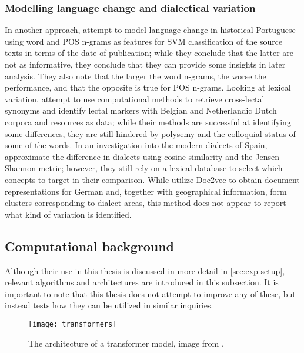 \subsubsection{Modelling language change and dialectical variation}
\label{subsubsec:modelling}

In another approach, \citet{zampieri-etal-2016-modeling} attempt to model language change in historical Portuguese using word and POS n-grams as features for SVM classification of the source texts in terms of the date of publication; while they conclude that the latter are not as informative, they conclude that they can provide some insights in later analysis. They also note that the larger the word n-grams, the worse the performance, and that the opposite is true for POS n-grams. Looking at lexical variation, \citet{peirsman_geeraerts_speelman_2010} attempt to use computational methods to retrieve cross-lectal synonyms and identify lectal markers with Belgian and Netherlandic Dutch corpora and resources as data; while their methods are successful at identifying some differences, they are still hindered by polysemy and the colloquial status of some of the words. In an investigation into the modern dialects of Spain, \citet{donoso-sanchez-2017-dialectometric} approximate the difference in dialects using cosine similarity and the Jensen-Shannon metric; however, they still rely on a lexical database to select which concepts to target in their comparison. While \citet{hovy-purschke-2018-capturing} utilize Doc2vec to obtain document representations for German and, together with geographical information, form clusters corresponding to dialect areas, this method does not appear to report what kind of variation is identified. 

\subsection{Computational background}
\label{subsec:algorithms}

Although their use in this thesis is discussed in more detail in \autoref{sec:exp-setup}, relevant algorithms and architectures are introduced in this subsection. It is important to note that this thesis does not attempt to improve any of these, but instead tests how they can be utilized in similar inquiries. 

\begin{figure}[H]
\centering
\texttt{[image: transformers]}
\caption{\label{fig:transformers} The architecture of a transformer model, image from \citet{vaswani2017attention}.}
\end{figure}


